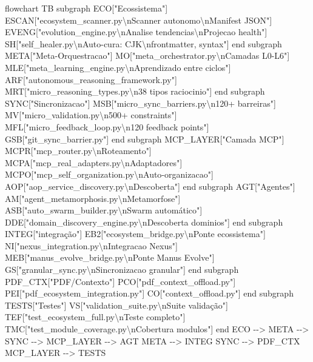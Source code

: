 \documentclass[
  12pt,
]{article}
\newenvironment{Shaded}{}{}
\newcommand{\NormalTok}[1]{#1}
\begin{document}
\begin{Shaded}
\begin{Highlighting}[]
\NormalTok{flowchart TB}
\NormalTok{subgraph ECO["Ecossistema"]}
\NormalTok{ESCAN["ecosystem\_scanner.py\textbackslash{}nScanner autonomo\textbackslash{}nManifest JSON"]}
\NormalTok{EVENG["evolution\_engine.py\textbackslash{}nAnalise tendencias\textbackslash{}nProjecao health"]}
\NormalTok{SH["self\_healer.py\textbackslash{}nAuto{-}cura: CJK\textbackslash{}nfrontmatter, syntax"]}
\NormalTok{end}
\NormalTok{subgraph META["Meta{-}Orquestracao"]}
\NormalTok{MO["meta\_orchestrator.py\textbackslash{}nCamadas L0{-}L6"]}
\NormalTok{MLE["meta\_learning\_engine.py\textbackslash{}nAprendizado entre ciclos"]}
\NormalTok{ARF["autonomous\_reasoning\_framework.py"]}
\NormalTok{MRT["micro\_reasoning\_types.py\textbackslash{}n38 tipos raciocinio"]}
\NormalTok{end}
\NormalTok{subgraph SYNC["Sincronizacao"]}
\NormalTok{MSB["micro\_sync\_barriers.py\textbackslash{}n120+ barreiras"]}
\NormalTok{MV["micro\_validation.py\textbackslash{}n500+ constraints"]}
\NormalTok{MFL["micro\_feedback\_loop.py\textbackslash{}n120 feedback points"]}
\NormalTok{GSB["git\_sync\_barrier.py"]}
\NormalTok{end}
\NormalTok{subgraph MCP\_LAYER["Camada MCP"]}
\NormalTok{MCPR["mcp\_router.py\textbackslash{}nRoteamento"]}
\NormalTok{MCPA["mcp\_real\_adapters.py\textbackslash{}nAdaptadores"]}
\NormalTok{MCPO["mcp\_self\_organization.py\textbackslash{}nAuto{-}organizacao"]}
\NormalTok{AOP["aop\_service\_discovery.py\textbackslash{}nDescoberta"]}
\NormalTok{end}
\NormalTok{subgraph AGT["Agentes"]}
\NormalTok{AM["agent\_metamorphosis.py\textbackslash{}nMetamorfose"]}
\NormalTok{ASB["auto\_swarm\_builder.py\textbackslash{}nSwarm automático"]}
\NormalTok{DDE["domain\_discovery\_engine.py\textbackslash{}nDescoberta dominios"]}
\NormalTok{end}
\NormalTok{subgraph INTEG["integração"]}
\NormalTok{EB2["ecosystem\_bridge.py\textbackslash{}nPonte ecossistema"]}
\NormalTok{NI["nexus\_integration.py\textbackslash{}nIntegracao Nexus"]}
\NormalTok{MEB["manus\_evolve\_bridge.py\textbackslash{}nPonte Manus Evolve"]}
\NormalTok{GS["granular\_sync.py\textbackslash{}nSincronizacao granular"]}
\NormalTok{end}
\NormalTok{subgraph PDF\_CTX["PDF/Contexto"]}
\NormalTok{PCO["pdf\_context\_offload.py"]}
\NormalTok{PEI["pdf\_ecosystem\_integration.py"]}
\NormalTok{CO["context\_offload.py"]}
\NormalTok{end}
\NormalTok{subgraph TESTS["Testes"]}
\NormalTok{VS["validation\_suite.py\textbackslash{}nSuite validação"]}
\NormalTok{TEF["test\_ecosystem\_full.py\textbackslash{}nTeste completo"]}
\NormalTok{TMC["test\_module\_coverage.py\textbackslash{}nCobertura modulos"]}
\NormalTok{end}
\NormalTok{ECO {-}{-}\textgreater{} META {-}{-}\textgreater{} SYNC {-}{-}\textgreater{} MCP\_LAYER {-}{-}\textgreater{} AGT}
\NormalTok{META {-}{-}\textgreater{} INTEG}
\NormalTok{SYNC {-}{-}\textgreater{} PDF\_CTX}
\NormalTok{MCP\_LAYER {-}{-}\textgreater{} TESTS}
\end{Highlighting}
\end{Shaded}
\end{document}
